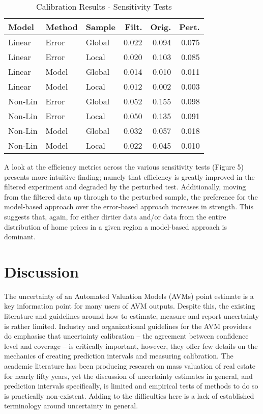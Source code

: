 \documentclass[colTwo]{format}
\theoremstyle{definition}
\begin{document}
\begin{table}[h]
\centering
\begin{tabular}{l|l|l|r|r|r}
\hline
\textbf{Model} & \textbf{Method} & \textbf{Sample} & \textbf{Filt.} & \textbf{Orig.} & \textbf{Pert.}\\
\hline
Linear & Error & Global & 0.022 & 0.094 & 0.075\\
Linear & Error & Local & 0.020 & 0.103 & 0.085\\
\hline
Linear & Model & Global & 0.014 & 0.010 & 0.011\\
Linear & Model & Local & 0.012 & 0.002 & 0.003\\
\hline
Non-Lin & Error & Global & 0.052 & 0.155 & 0.098\\
Non-Lin & Error & Local & 0.050 & 0.135 & 0.091\\
\hline
Non-Lin & Model & Global & 0.032 & 0.057 & 0.018\\
Non-Lin & Model & Local & 0.022 & 0.045 & 0.010\\
\hline
\end{tabular}
\caption{Calibration Results - Sensitivity Tests}
\label{table:calibsens}
\end{table}

A look at the efficiency metrics across the various sensitivity tests (Figure 5) presents more intuitive finding; namely that efficiency is greatly improved in the filtered experiment and degraded by the perturbed test. Additionally, moving from the filtered data up through to the perturbed sample, the preference for the model-based approach over the error-based approach increases in strength.  This suggests that, again, for either dirtier data and/or data from the entire distribution of home prices in a given region a model-based approach is dominant.  

\section{Discussion}

The uncertainty of an Automated Valuation Models (AVMs) point estimate is a key information point for many users of AVM outputs.  Despite this, the existing literature and guidelines around how to estimate, measure and report uncertainty is rather limited.  Industry and organizational guidelines for the AVM providers do emphasise that uncertainty calibration -- the agreement between confidence level and coverage -- is critically important, however, they offer few details on the mechanics of creating prediction intervals and measuring calibration. The academic literature has been producing research on mass valuation of real estate for nearly fifty years, yet the discussion of uncertainty estimates in general, and prediction intervals specifically, is limited and empirical tests of methods to do so is practically non-existent.  Adding to the difficulties here is a lack of established terminology around uncertainty in general.  
\end{document}
